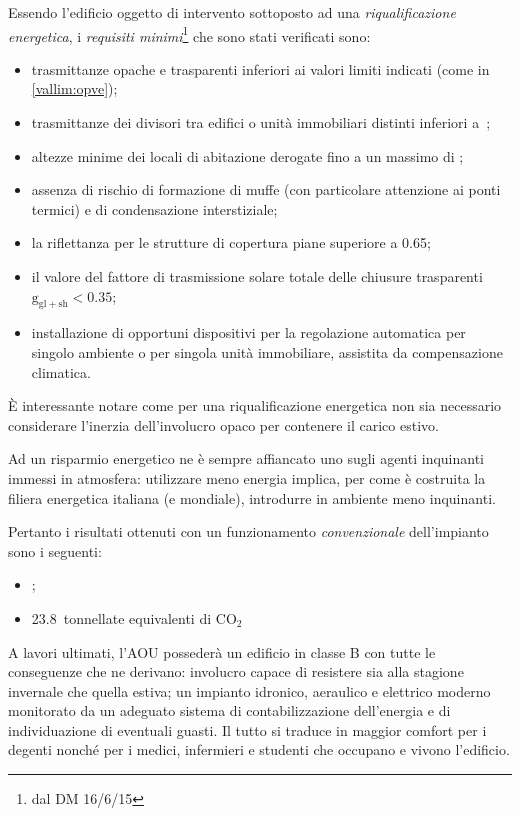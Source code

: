 Essendo l'edificio oggetto di intervento sottoposto ad una \emph{riqualificazione energetica}, i \emph{requisiti minimi}\footnote{dal DM 16/6/15} che sono stati verificati sono:
\begin{itemize}
	\item trasmittanze opache e trasparenti inferiori ai valori limiti indicati (come in \vref{vallim:opve});
	\item trasmittanze dei divisori tra edifici o unità immobiliari distinti inferiori a~;
	\item altezze minime dei locali di abitazione derogate fino a un massimo di ;
	\item assenza di rischio di formazione di muffe (con particolare attenzione ai ponti termici) e di condensazione interstiziale;
	\item la riflettanza per le strutture di copertura piane superiore a \num{0.65};
	\item il valore del fattore di trasmissione solare totale delle chiusure trasparenti $\mathrm{g_{gl+sh}<0.35}$;
	\item installazione di opportuni dispositivi per la regolazione automatica per singolo ambiente o per singola unità immobiliare, assistita da compensazione climatica.
\end{itemize}
È interessante notare come per una riqualificazione energetica non sia necessario considerare l'inerzia dell'involucro opaco per contenere il carico estivo.

Ad un risparmio energetico ne è sempre affiancato uno sugli agenti inquinanti immessi in atmosfera: utilizzare meno energia implica, per come è costruita la filiera energetica italiana (e mondiale), introdurre in ambiente meno inquinanti. 

Pertanto i risultati ottenuti con un funzionamento \emph{convenzionale} dell'impianto sono i seguenti:
\begin{itemize}
	\item {}; %
	\item \num{23.8}\ tonnellate equivalenti di $\mathrm{CO_2}$ %
\end{itemize}

A lavori ultimati, l'AOU possederà un edificio in classe B con tutte le conseguenze che ne derivano: involucro capace di resistere sia alla stagione invernale che quella estiva; un impianto idronico, aeraulico e elettrico moderno monitorato da un adeguato sistema di contabilizzazione dell'energia e di individuazione di eventuali guasti. Il tutto si traduce in maggior comfort per i degenti nonché per i medici, infermieri e studenti che occupano e vivono l'edificio. 